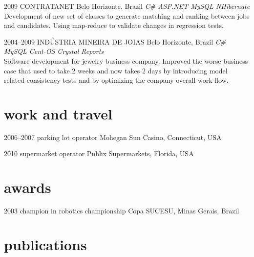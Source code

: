 \documentclass[]{friggeri-cv}
\begin{document}
\begin{entrylist}
\entry
{2009}
{CONTRATANET}
{Belo Horizonte, Brazil}
{\emph{\bullet C\# \bullet ASP.NET \bullet MySQL \bullet NHibernate } \\Development of new set of classes to generate matching and ranking between jobs and candidates. Using map-reduce to validate changes in regression tests. }


%
 \entry
 {2004--2009}
 {INDÚSTRIA MINEIRA DE JOIAS}
 {Belo Horizonte, Brazil}
 {\emph{\bullet C\# \bullet MySQL \bullet Cent-OS \bullet Crystal Reports } \\ Software development for jewelry business company.
  Improved the worse business case that used to take 2 weeks and now takes 2 days by introducing model related consistency tests and by optimizing the company overall work-flow. }
%

\end{entrylist}
\section{work and travel} 

\begin{entrylist}

\entry
{2006--2007}
{parking lot {\normalfont operator}}
{Mohegan Sun Casino, Connecticut, USA}

\entry
{2010} 
{supermarket {\normalfont operator}}
{Publix Supermarkets, Florida, USA}

\end{entrylist}


\section{awards}


\begin{entrylist}

\entry
{2003} 
{champion {\normalfont in robotics championship}}
{Copa SUCESU, Minas Gerais, Brazil}

\end{entrylist}

\section{publications}
\end{document}
